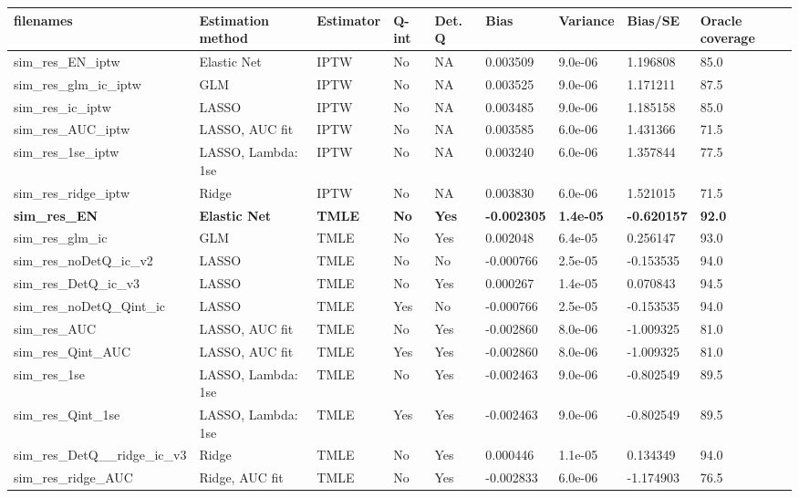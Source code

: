
\begin{longtable}[l]{lllllllll}
\toprule
filenames & Estimation method & Estimator & Q-int & Det. Q & Bias & Variance & Bias/SE & Oracle coverage\\
\midrule
sim\_res\_EN\_iptw & Elastic Net & IPTW & No & NA & 0.003509 & 9.0e-06 & 1.196808 & 85.0\\
sim\_res\_glm\_ic\_iptw & GLM & IPTW & No & NA & 0.003525 & 9.0e-06 & 1.171211 & 87.5\\
sim\_res\_ic\_iptw & LASSO & IPTW & No & NA & 0.003485 & 9.0e-06 & 1.185158 & 85.0\\
sim\_res\_AUC\_iptw & LASSO, AUC fit & IPTW & No & NA & 0.003585 & 6.0e-06 & 1.431366 & 71.5\\
sim\_res\_1se\_iptw & LASSO, Lambda: 1se & IPTW & No & NA & 0.003240 & 6.0e-06 & 1.357844 & 77.5\\
sim\_res\_ridge\_iptw & Ridge & IPTW & No & NA & 0.003830 & 6.0e-06 & 1.521015 & 71.5\\
\midrule
\textbf{sim\_res\_EN} & \textbf{Elastic Net} & \textbf{TMLE} & \textbf{No} & \textbf{Yes} & \textbf{-0.002305} & \textbf{1.4e-05} & \textbf{-0.620157} & \textbf{92.0}\\
\midrule
sim\_res\_glm\_ic & GLM & TMLE & No & Yes & 0.002048 & 6.4e-05 & 0.256147 & 93.0\\
sim\_res\_noDetQ\_ic\_v2 & LASSO & TMLE & No & No & -0.000766 & 2.5e-05 & -0.153535 & 94.0\\
sim\_res\_DetQ\_ic\_v3 & LASSO & TMLE & No & Yes & 0.000267 & 1.4e-05 & 0.070843 & 94.5\\
sim\_res\_noDetQ\_Qint\_ic & LASSO & TMLE & Yes & No & -0.000766 & 2.5e-05 & -0.153535 & 94.0\\
sim\_res\_AUC & LASSO, AUC fit & TMLE & No & Yes & -0.002860 & 8.0e-06 & -1.009325 & 81.0\\
sim\_res\_Qint\_AUC & LASSO, AUC fit & TMLE & Yes & Yes & -0.002860 & 8.0e-06 & -1.009325 & 81.0\\
sim\_res\_1se & LASSO, Lambda: 1se & TMLE & No & Yes & -0.002463 & 9.0e-06 & -0.802549 & 89.5\\
sim\_res\_Qint\_1se & LASSO, Lambda: 1se & TMLE & Yes & Yes & -0.002463 & 9.0e-06 & -0.802549 & 89.5\\
sim\_res\_DetQ\_\_ridge\_ic\_v3 & Ridge & TMLE & No & Yes & 0.000446 & 1.1e-05 & 0.134349 & 94.0\\
sim\_res\_ridge\_AUC & Ridge, AUC fit & TMLE & No & Yes & -0.002833 & 6.0e-06 & -1.174903 & 76.5\\
\bottomrule
\end{longtable}
